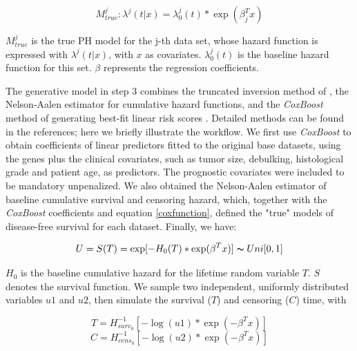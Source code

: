 \documentclass{bioinfo}
\begin{document}
    \begin{equation}\label{coxfunction}
      M^{j}_{true} : \lambda^{j}(t|x) = \lambda^{j}_{0}(t) * \exp(\beta_{j}^{T}x)
    \end{equation}

    $M^{j}_{true}$ is the true PH model for the j-th data set,
    whose hazard function is expressed with $\lambda^{j}(t|x)$,
    with $x$ as covariates. $\lambda^{j}_{0}(t)$ is the baseline
    hazard function for this set. $\beta$ represents the regression
    coefficients.

    The generative model in step 3 combines the truncated inversion
    method of \citet{Bender2005}, the Nelson-Aalen estimator
    \citep{Nelson1969,Nelson1972,Aalen1978}
    for cumulative hazard functions, and the \emph{CoxBoost} method of
    generating best-fit linear risk scores
    \citep{Binder2008}. Detailed methods can be found in the references;
    here we briefly illustrate the workflow. We first
    use \emph{CoxBoost} to obtain coefficients of linear predictors
    fitted to the original base datasets, using the genes plus the 
    clinical covariates, such as
    tumor size, debulking, histological grade and patient age, as predictors.
    The prognostic covariates were included to be mandatory unpenalized.
    We also obtained the Nelson-Aalen estimator of baseline cumulative survival and
    censoring hazard, which, together with the \emph{CoxBoost}
    coefficients and equation \ref{coxfunction}, defined the "true"
    models of disease-free survival for each dataset.  Finally, we have:

    \begin{equation}\label{uniformrv}
      U = S(T) = \exp[-H_{0}(T) * \exp(\beta^{T}x)] \thicksim Uni[0,1]
    \end{equation}

    $H_{0}$ is the baseline cumulative hazard for the lifetime random variable $T$. $S$ denotes the survival function. We sample two independent, uniformly distributed
    variables $u1$ and $u2$, then simulate the survival ($T$) and censoring ($C$)
    time, with

    \begin{equation}\label{survivaltime}
      T = H_{surv_{0}}^{-1} [ - \log(u1) * \exp(-\beta^{T}x)]
    \end{equation}
    \begin{equation}\label{censoringtime}
      C = H_{cens_{0}}^{-1} [ - \log(u2) * \exp(-\beta^{T}x)]
    \end{equation}
\end{document}
